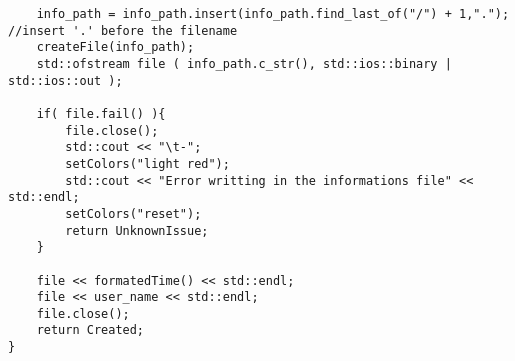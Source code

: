 \begin{lstlisting}
    info_path = info_path.insert(info_path.find_last_of("/") + 1,"."); //insert '.' before the filename
    createFile(info_path);
    std::ofstream file ( info_path.c_str(), std::ios::binary | std::ios::out );

    if( file.fail() ){
        file.close();
        std::cout << "\t-";
        setColors("light red");
        std::cout << "Error writting in the informations file" << std::endl;
        setColors("reset");
        return UnknownIssue;
    }

    file << formatedTime() << std::endl;
    file << user_name << std::endl;
    file.close();
    return Created;
}
\end{lstlisting}